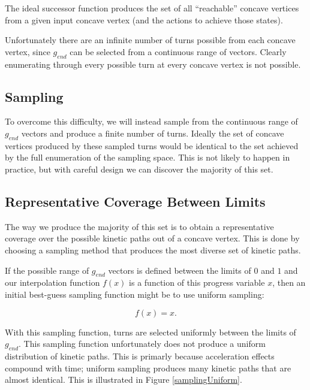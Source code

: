The ideal successor function produces the set of all ``reachable'' concave vertices from a given input concave vertex (and the actions to achieve those states).

Unfortunately there are an infinite number of turns possible from each concave vertex, since $g_{end}$ can be selected from a continuous range of vectors. Clearly enumerating through every possible turn at every concave vertex is not possible.

	\subsection{Sampling}

To overcome this difficulty, we will instead sample from the continuous range of $g_{end}$ vectors and produce a finite number of turns. Ideally the set of concave vertices produced by these sampled turns would be identical to the set achieved by the full enumeration of the sampling space. This is not likely to happen in practice, but with careful design we can discover the majority of this set.


	\subsection{Representative Coverage Between Limits}

The way we produce the majority of this set is to obtain a representative coverage over the possible kinetic paths out of a concave vertex. This is done by choosing a sampling method that produces the most diverse set of kinetic paths.

If the possible range of $g_{end}$ vectors is defined between the limits of $0$ and $1$ and our interpolation function $f(x)$ is a function of this progress variable $x$, then an initial best-guess sampling function might be to use uniform sampling:

$$
f(x) = x.
$$

With this sampling function, turns are selected uniformly between the limits of $g_{end}$. This sampling function unfortunately does not produce a uniform distribution of kinetic paths. This is primarly because acceleration effects compound with time; uniform sampling produces many kinetic paths that are almost identical. This is illustrated in Figure \ref{samplingUniform}.

